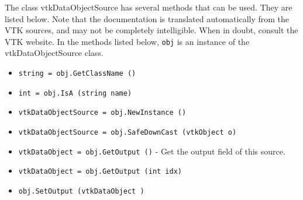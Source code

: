 The class vtkDataObjectSource has several methods that can be used.
  They are listed below.
Note that the documentation is translated automatically from the VTK sources,
and may not be completely intelligible.  When in doubt, consult the VTK website.
In the methods listed below, \verb|obj| is an instance of the vtkDataObjectSource class.
\begin{itemize}
\item  \verb|string = obj.GetClassName ()|

\item  \verb|int = obj.IsA (string name)|

\item  \verb|vtkDataObjectSource = obj.NewInstance ()|

\item  \verb|vtkDataObjectSource = obj.SafeDownCast (vtkObject o)|

\item  \verb|vtkDataObject = obj.GetOutput ()| -  Get the output field of this source.

\item  \verb|vtkDataObject = obj.GetOutput (int idx)|

\item  \verb|obj.SetOutput (vtkDataObject )|

\end{itemize}

